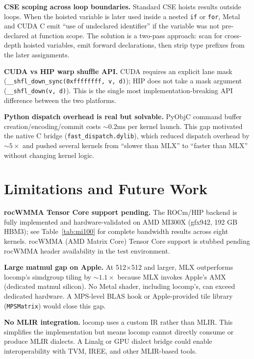 \documentclass[10pt,twocolumn]{article}
\begin{document}
\textbf{CSE scoping across loop boundaries.} Standard CSE hoists results
outside loops. When the hoisted variable is later used inside a nested
\texttt{if} or \texttt{for}, Metal and CUDA C emit ``use of undeclared identifier''
if the variable was not pre-declared at function scope. The solution is a
two-pass approach: scan for cross-depth hoisted variables, emit forward
declarations, then strip type prefixes from the later assignments.

\textbf{CUDA vs HIP warp shuffle API.} CUDA requires an explicit lane mask
(\texttt{\_\_shfl\_down\_sync(0xffffffff, v, d)}); HIP does not take a mask
argument (\texttt{\_\_shfl\_down(v, d)}). This is the single most
implementation-breaking API difference between the two platforms.

\textbf{Python dispatch overhead is real but solvable.} PyObjC command buffer
creation/encoding/commit costs ${\sim}0.2$ms per kernel launch. This gap
motivated the native C bridge (\texttt{fast\_dispatch.dylib}), which reduced
dispatch overhead by ${\sim}5\times$ and pushed several kernels from ``slower
than MLX'' to ``faster than MLX'' without changing kernel logic.

\section{Limitations and Future Work}
\label{sec:limits}

\textbf{rocWMMA Tensor Core support pending.} The ROCm/HIP backend is fully implemented
and hardware-validated on AMD MI300X (gfx942, 192 GB HBM3); see Table~\ref{tab:mi100}
for complete bandwidth results across eight kernels. rocWMMA (AMD Matrix Core)
Tensor Core support is stubbed pending rocWMMA header availability in the test environment.

\textbf{Large matmul gap on Apple.} At 512$\times$512 and larger, MLX outperforms
locomp's simdgroup tiling by ${\sim}1.1\times$ because MLX invokes Apple's AMX
(dedicated matmul silicon). No Metal shader, including locomp's, can exceed
dedicated hardware. A MPS-level BLAS hook or Apple-provided tile library
(\texttt{MPSMatrix}) would close this gap.

\textbf{No MLIR integration.} locomp uses a custom IR rather than MLIR.
This simplifies the implementation but means locomp cannot directly consume
or produce MLIR dialects. A Linalg or GPU dialect bridge could enable
interoperability with TVM, IREE, and other MLIR-based tools.
\end{document}
